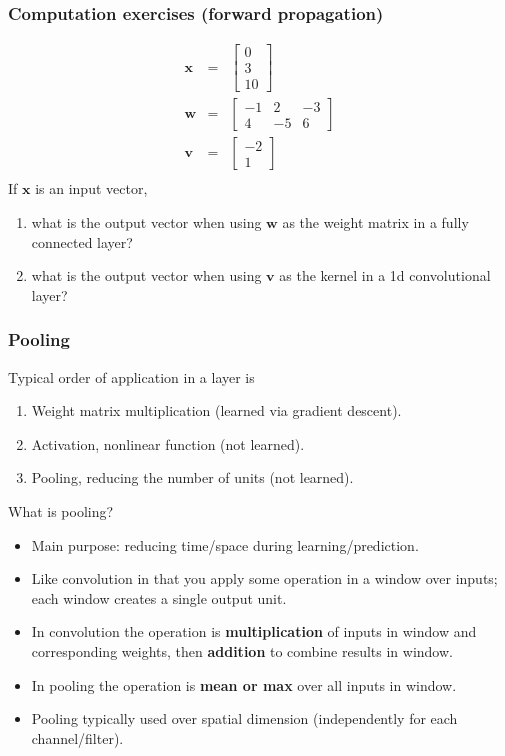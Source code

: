 \documentclass{beamer}
\begin{document}
\begin{frame}
  \frametitle{Computation exercises (forward propagation)}
  \begin{eqnarray*}
    \mathbf x &=& \begin{bmatrix}
      0 \\
      3 \\
      10
    \end{bmatrix}\\
    \mathbf w &=& \begin{bmatrix}
      -1 & 2 & -3 \\
      4 & -5 & 6
    \end{bmatrix}\\
    \mathbf v &=& \begin{bmatrix}
      -2 \\
      1
    \end{bmatrix}\\
  \end{eqnarray*}
  If $\mathbf x$ is an input vector,
  \begin{enumerate}
  \item what is the output vector when using $\mathbf w$ as the weight
    matrix in a fully connected layer?
  \item what is the output vector when using $\mathbf v$ as the kernel
    in a 1d convolutional layer?
  \end{enumerate}
\end{frame}
  
\begin{frame}
  \frametitle{Pooling}
  Typical order of application in a layer is
  \begin{enumerate}
  \item Weight matrix multiplication (learned via gradient descent).
  \item Activation, nonlinear function (not learned).
  \item Pooling, reducing the number of units (not learned).
  \end{enumerate}
  What is pooling? 
  \begin{itemize}
  \item Main purpose: reducing time/space during learning/prediction.
  \item Like convolution in that you apply some operation in a window
    over inputs; each window creates a single output unit.
  \item In convolution the operation is \textbf{multiplication} of inputs in
    window and corresponding weights, then \textbf{addition} to combine results
    in window.
  \item In pooling the operation is \textbf{mean or max} over all inputs in
    window.
  \item Pooling typically used over spatial dimension (independently
    for each channel/filter). 
  \end{itemize} 
\end{frame}
\end{document}
